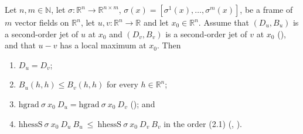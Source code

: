 \begin{theorem}
Let $n,m\in\mathbb N$, let
$\sigma:\mathbb R^{n}\to\mathbb R^{n\times m}$, $\sigma(x)=[\sigma^1(x),\ldots,\sigma^m(x)]$,
be a frame of $m$ vector fields on $\mathbb R^{n}$, let
$u,v:\mathbb R^{n}\to\mathbb R$ and let $x_0\in\mathbb R^{n}$. Assume that $(D_u,B_u)$ is a
second-order jet of $u$ at $x_0$ and $(D_v,B_v)$ is a second-order jet of $v$ at $x_0$
(), and that $u-v$ has a local maximum at $x_0$. Then
\begin{enumerate}
\item $D_u=D_v$;
\item $B_u(h,h)\le B_v(h,h)$ for every $h\in\mathbb R^{n}$;
\item $\mathrm{hgrad}\ \sigma\ x_0\ D_u=\mathrm{hgrad}\ \sigma\ x_0\ D_v$
  (); and
\item $\mathrm{hhessS}\ \sigma\ x_0\ D_u\ B_u\ \le\ \mathrm{hhessS}\ \sigma\ x_0\ D_v\ B_v$
  in the order (2.1) (, ).
\end{enumerate}
\end{theorem}
